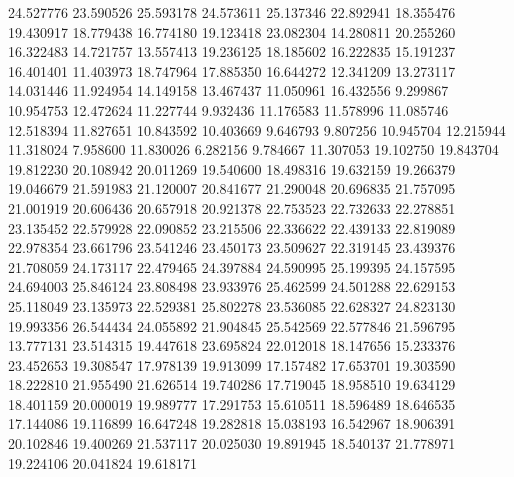 24.527776
23.590526
25.593178
24.573611
25.137346
22.892941
18.355476
19.430917
18.779438
16.774180
19.123418
23.082304
14.280811
20.255260
16.322483
14.721757
13.557413
19.236125
18.185602
16.222835
15.191237
16.401401
11.403973
18.747964
17.885350
16.644272
12.341209
13.273117
14.031446
11.924954
14.149158
13.467437
11.050961
16.432556
9.299867
10.954753
12.472624
11.227744
9.932436
11.176583
11.578996
11.085746
12.518394
11.827651
10.843592
10.403669
9.646793
9.807256
10.945704
12.215944
11.318024
7.958600
11.830026
6.282156
9.784667
11.307053
19.102750
19.843704
19.812230
20.108942
20.011269
19.540600
18.498316
19.632159
19.266379
19.046679
21.591983
21.120007
20.841677
21.290048
20.696835
21.757095
21.001919
20.606436
20.657918
20.921378
22.753523
22.732633
22.278851
23.135452
22.579928
22.090852
23.215506
22.336622
22.439133
22.819089
22.978354
23.661796
23.541246
23.450173
23.509627
22.319145
23.439376
21.708059
24.173117
22.479465
24.397884
24.590995
25.199395
24.157595
24.694003
25.846124
23.808498
23.933976
25.462599
24.501288
22.629153
25.118049
23.135973
22.529381
25.802278
23.536085
22.628327
24.823130
19.993356
26.544434
24.055892
21.904845
25.542569
22.577846
21.596795
13.777131
23.514315
19.447618
23.695824
22.012018
18.147656
15.233376
23.452653
19.308547
17.978139
19.913099
17.157482
17.653701
19.303590
18.222810
21.955490
21.626514
19.740286
17.719045
18.958510
19.634129
18.401159
20.000019
19.989777
17.291753
15.610511
18.596489
18.646535
17.144086
19.116899
16.647248
19.282818
15.038193
16.542967
18.906391
20.102846
19.400269
21.537117
20.025030
19.891945
18.540137
21.778971
19.224106
20.041824
19.618171
